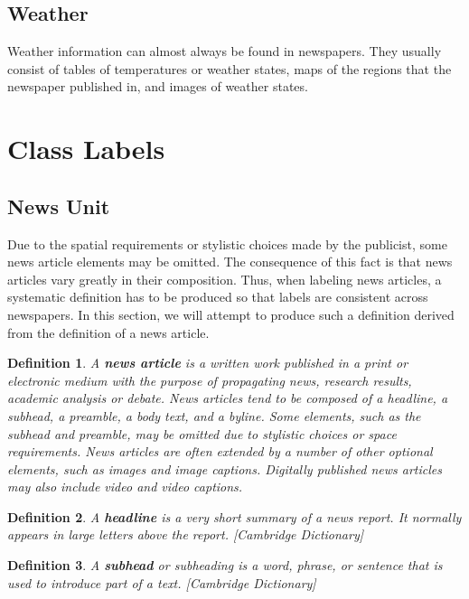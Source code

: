 \documentclass[english, bibtex]{kththesis}
\begin{document}
\subsection{Weather}

Weather information can almost always be found in newspapers. They usually consist of tables of temperatures or weather states, maps of the regions that the newspaper published in, and images of weather states. 


\section{Class Labels}

\subsection{News Unit}

Due to the spatial requirements or stylistic choices made by the publicist, some news article elements may be omitted. The consequence of this fact is that news articles vary greatly in their composition. Thus, when labeling news articles, a systematic definition has to be produced so that labels are consistent across newspapers. In this section, we will attempt to produce such a definition derived from the definition of a news article.

\newtheorem{thm}{Theorem}
\newtheorem{defn}[thm]{Definition}
\begin{defn}
\label{newsarticle}
A \textbf{news article} is a written work published in a print or electronic medium with the purpose of propagating news, research results, academic analysis or debate. News articles tend to be composed of a headline, a subhead, a preamble, a body text, and a byline. Some elements, such as the subhead and preamble, may be omitted due to stylistic choices or space requirements. News articles are often extended by a number of other optional elements, such as images and image captions. Digitally published news articles may also include video and video captions.
\end{defn}

\begin{defn}
\label{headline}
A \textbf{headline} is a very short summary of a news report. It normally appears in large letters above the report. [Cambridge Dictionary]
\end{defn}

\begin{defn}
\label{subhead}
A \textbf{subhead} or subheading is a word, phrase, or sentence that is used to introduce part of a text. [Cambridge Dictionary]
\end{defn}
\end{document}
